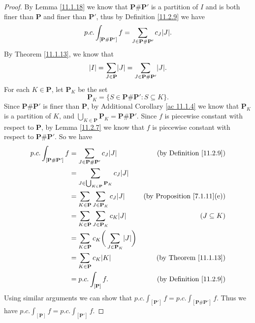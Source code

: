 \begin{proof}
    By Lemma \ref{11.1.18} we know that \(\mathbf{P} \# \mathbf{P}'\) is a partition of \(I\) and is both finer than \(\mathbf{P}\) and finer than \(\mathbf{P}'\), thus by Definition \ref{11.2.9} we have
    \[
        p.c. \int_{[\mathbf{P} \# \mathbf{P}']} f = \sum_{J \in \mathbf{P} \# \mathbf{P}'} c_J \abs{J}.
    \]
    By Theorem \ref{11.1.13}, we know that
    \[
        \abs{I} = \sum_{J \in \mathbf{P}} \abs{J} = \sum_{J \in \mathbf{P} \# \mathbf{P}'} \abs{J}.
    \]
    For each \(K \in \mathbf{P}\), let \(\mathbf{P}_K\) be the set
    \[
        \mathbf{P}_K = \{S \in \mathbf{P} \# \mathbf{P}' : S \subseteq K\}.
    \]
    Since \(\mathbf{P} \# \mathbf{P}'\) is finer than \(\mathbf{P}\), by Additional Corollary \ref{ac 11.1.4} we know that \(\mathbf{P}_K\) is a partition of \(K\), and \(\bigcup_{K \in \mathbf{P}} \mathbf{P}_K = \mathbf{P} \# \mathbf{P}'\).
    Since \(f\) is piecewise constant with respect to \(\mathbf{P}\), by Lemma \ref{11.2.7} we know that \(f\) is piecewise constant with respect to \(\mathbf{P} \# \mathbf{P}'\).
    So we have
    \begin{align*}
        p.c. \int_{[\mathbf{P} \# \mathbf{P}']} f & = \sum_{J \in \mathbf{P} \# \mathbf{P}'} c_J \abs{J}                        & \text{(by Definition \ref{11.2.9})}     \\
                                                  & = \sum_{J \in \bigcup_{K \in \mathbf{P}} \mathbf{P}_K} c_J \abs{J}                                                    \\
                                                  & = \sum_{K \in \mathbf{P}} \sum_{J \in \mathbf{P}_K} c_J \abs{J}             & \text{(by Proposition \ref{7.1.11}(e))} \\
                                                  & = \sum_{K \in \mathbf{P}} \sum_{J \in \mathbf{P}_K} c_K \abs{J}             & (J \subseteq K)                         \\
                                                  & = \sum_{K \in \mathbf{P}} c_K \bigg(\sum_{J \in \mathbf{P}_K} \abs{J}\bigg)                                           \\
                                                  & = \sum_{K \in \mathbf{P}} c_K \abs{K}                                       & \text{(by Theorem \ref{11.1.13})}       \\
                                                  & = p.c. \int_{[\mathbf{P}]} f.                                               & \text{(by Definition \ref{11.2.9})}
    \end{align*}
    Using similar arguments we can show that \(p.c. \int_{[\mathbf{P}']} f = p.c. \int_{[\mathbf{P} \# \mathbf{P}']} f\).
    Thus we have \(p.c. \int_{[\mathbf{P}]} f = p.c. \int_{[\mathbf{P}']} f\).
\end{proof}

